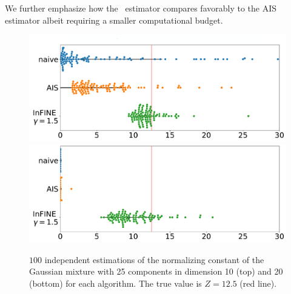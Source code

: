 \documentclass{article}
\begin{document}
We further emphasize how the \IFIS\ estimator compares favorably to the AIS estimator albeit requiring a smaller computational budget.
\begin{figure}[!ht]
    \centering
    \includegraphics[width= 1.\linewidth]{pics/boxplot_dim10.pdf}
        \includegraphics[width= 1.\linewidth]{pics/boxplot_dim20.pdf}
    \caption{$100$ independent estimations of the normalizing constant of the Gaussian mixture with 25 components in dimension 10 (top) and 20 (bottom) for each algorithm. The true value is $Z=12.5$ (red line).}
    \label{fig:25_gauss}
\end{figure}
\end{document}
